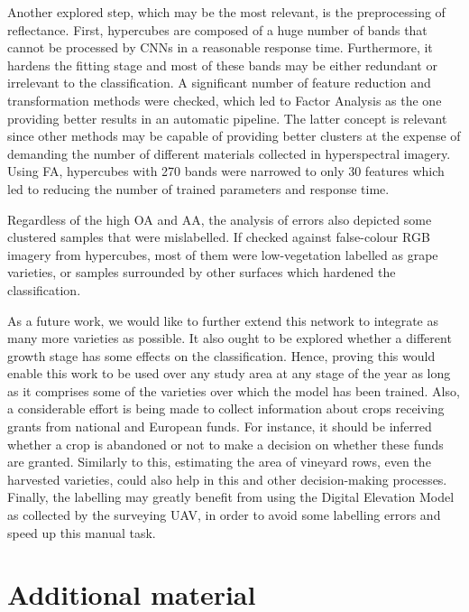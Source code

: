 Another explored step, which may be the most relevant, is the preprocessing of reflectance. First, hypercubes are composed of a huge number of bands that cannot be processed by CNNs in a reasonable response time. Furthermore, it hardens the fitting stage and most of these bands may be either redundant or irrelevant to the classification. A significant number of feature reduction and transformation methods were checked, which led to Factor Analysis as the one providing better results in an automatic pipeline. The latter concept is relevant since other methods may be capable of providing better clusters at the expense of demanding the number of different materials collected in hyperspectral imagery. Using FA, hypercubes with 270 bands were narrowed to only 30 features which led to reducing the number of trained parameters and response time. 

Regardless of the high OA and AA, the analysis of errors also depicted some clustered samples that were mislabelled. If checked against false-colour RGB imagery from hypercubes, most of them were low-vegetation labelled as grape varieties, or samples surrounded by other surfaces which hardened the classification. 

As a future work, we would like to further extend this network to integrate as many more varieties as possible. It also ought to be explored whether a different growth stage has some effects on the classification. Hence, proving this would enable this work to be used over any study area at any stage of the year as long as it comprises some of the varieties over which the model has been trained. Also, a considerable effort is being made to collect information about crops receiving grants from national and European funds. For instance, it should be inferred whether a crop is abandoned or not to make a decision on whether these funds are granted. Similarly to this, estimating the area of vineyard rows, even the harvested varieties, could also help in this and other decision-making processes. Finally, the labelling may greatly benefit from using the Digital Elevation Model as collected by the surveying UAV, in order to avoid some labelling errors and speed up this manual task. 

\section*{Additional material}

